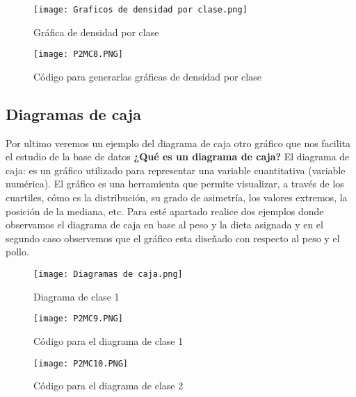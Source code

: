 \documentclass{article}
\begin{document}
\begin{figure}[h]
    \centering
    \texttt{[image: Graficos de densidad por clase.png]}
    \caption{Gráfica de densidad por clase }
    \label{fig:mesh10}
\end{figure}

\begin{figure}[h]
    \centering
    \texttt{[image: P2MC8.PNG]}
    \caption{Código para generarlas gráficas de densidad por clase  }
    \label{fig:mesh11}
\end{figure}

\subsection{Diagramas de caja}
Por ultimo veremos un ejemplo del diagrama de caja otro gráfico que nos facilita el estudio de la base de datos
\newline
{}
\textbf{¿Qué es un diagrama de caja?}
\newline
El diagrama de caja: es un gráfico utilizado para representar una variable cuantitativa (variable numérica). El gráfico es una herramienta que permite visualizar, a través de los cuartiles, cómo es la distribución, su grado de asimetría, los valores extremos, la posición de la mediana, etc.
\newline
\newline
Para esté apartado realice dos ejemplos donde observamos el diagrama de caja en base al peso y la dieta asignada y en el segundo caso observemos que el gráfico esta diseñado con respecto al peso y el pollo.


\newpage
\begin{figure}[h]
    \centering
    \texttt{[image: Diagramas de caja.png]}
    \caption{Diagrama de clase 1 }
    \label{fig:mesh12}
\end{figure}

\begin{figure}[h]
    \centering
    \texttt{[image: P2MC9.PNG]}
    \caption{Código para el diagrama de clase 1  }
    \label{fig:mesh13}
\end{figure}

\begin{figure}[h]
    \centering
    \texttt{[image: P2MC10.PNG]}
    \caption{Código para el diagrama de clase 2  }
    \label{fig:mesh14}
\end{figure}
\end{document}
